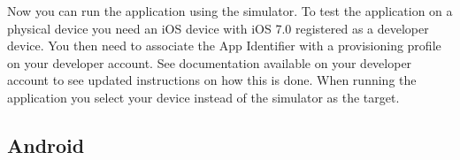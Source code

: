 Now you can run the application using the simulator. To test the application on a physical device you need an iOS device with iOS 7.0 registered as a developer device. You then need to associate the App Identifier with a provisioning profile on your developer account. See documentation available on your developer account to see updated instructions on how this is done. When running the application you select your device instead of the simulator as the target.

\subsection{Android}